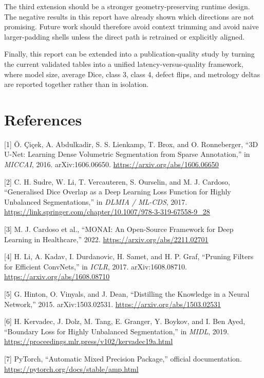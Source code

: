 The third extension should be a stronger geometry-preserving runtime
design. The negative results in this report have already shown which
directions are not promising. Future work should therefore avoid context
trimming and avoid naive larger-padding shells unless the direct path is
retrained or explicitly aligned.

Finally, this report can be extended into a publication-quality study by
turning the current validated tables into a unified
latency-versus-quality framework, where model size, average Dice, class
3, class 4, defect flips, and metrology deltas are
reported together rather than in isolation.

\hypertarget{references}{%
\chapter*{References}\label{references}}

{[}1{]} Ö. Çiçek, A. Abdulkadir, S. S. Lienkamp, T. Brox, and O.
Ronneberger, ``3D U-Net: Learning Dense Volumetric Segmentation from
Sparse Annotation,'' in \emph{MICCAI}, 2016. arXiv:1606.06650.
\url{https://arxiv.org/abs/1606.06650}

{[}2{]} C. H. Sudre, W. Li, T. Vercauteren, S. Ourselin, and M. J.
Cardoso, ``Generalised Dice Overlap as a Deep Learning Loss Function for
Highly Unbalanced Segmentations,'' in \emph{DLMIA / ML-CDS}, 2017.
\url{https://link.springer.com/chapter/10.1007/978-3-319-67558-9\_28}

{[}3{]} M. J. Cardoso et al., ``MONAI: An Open-Source Framework for Deep
Learning in Healthcare,'' 2022. \url{https://arxiv.org/abs/2211.02701}

{[}4{]} H. Li, A. Kadav, I. Durdanovic, H. Samet, and H. P. Graf,
``Pruning Filters for Efficient ConvNets,'' in \emph{ICLR}, 2017.
arXiv:1608.08710. \url{https://arxiv.org/abs/1608.08710}

{[}5{]} G. Hinton, O. Vinyals, and J. Dean, ``Distilling the Knowledge
in a Neural Network,'' 2015. arXiv:1503.02531.
\url{https://arxiv.org/abs/1503.02531}

{[}6{]} H. Kervadec, J. Dolz, M. Tang, E. Granger, Y. Boykov, and I. Ben
Ayed, ``Boundary Loss for Highly Unbalanced Segmentation,'' in
\emph{MIDL}, 2019. \url{https://proceedings.mlr.press/v102/kervadec19a.html}

{[}7{]} PyTorch, ``Automatic Mixed Precision Package,'' official
documentation. \url{https://pytorch.org/docs/stable/amp.html}

